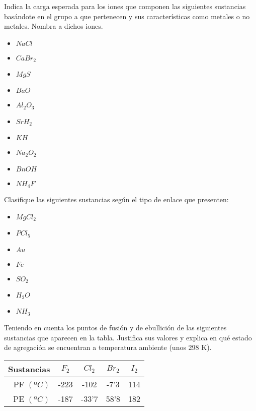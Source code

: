 \begin{prob}
Indica la carga esperada para los iones que componen las siguientes sustancias basándote en el grupo
a que pertenecen y sus características como metales o no metales. Nombra a dichos iones.
\begin{itemize}
\item $NaCl$
\item $CaBr_2$
\item $MgS$
\item $BaO$
\item $Al_2O_3$
\item $SrH_2$
\item $KH$
\item $Na_2O_2$
\item $BnOH$
\item $NH_4F$
\end{itemize}
\end{prob}


\begin{prob}
Clasifique las siguientes sustancias según el tipo de enlace que presenten:
\begin{itemize}
\item $MgCl_2$
\item $PCl_5$
\item $Au$
\item $Fe$
\item $SO_2$
\item $H_2O$
\item $NH_3$
\end{itemize}
\end{prob}


\begin{prob}
Teniendo en cuenta los puntos de fusión y de ebullición de las siguientes sustancias que aparecen en la tabla. 
Justifica sus valores y explica en qué estado de agregación se encuentran a temperatura ambiente (unos 298 K).
\vspace{8pt}

\begin{tabular}{|r|c|c|c|c|}
\hline
Sustancias& $F_2$& $Cl_2$& $Br_2$& $I_2$\\
\hline
PF $(ºC)$	&-223	&-102	&-7'3		&114\\
\hline
PE $(ºC)$	&-187	&-33'7	&58'8	&182\\
\hline
\end{tabular}

\end{prob}


